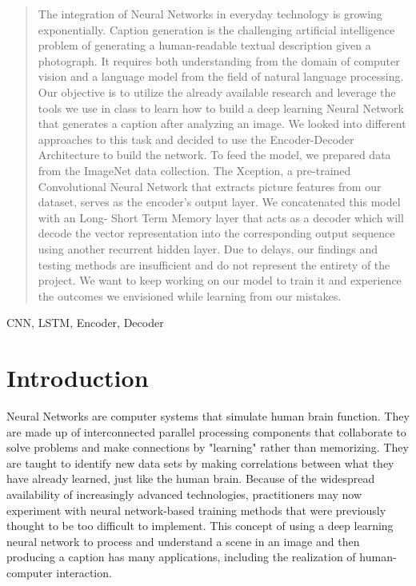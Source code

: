 \documentclass[conference]{IEEEtran}
\begin{document}
\begin{abstract}
The integration of Neural Networks in everyday technology is growing exponentially. Caption generation is the challenging artificial intelligence problem of generating a human-readable textual description given a photograph. It requires both understanding from the domain of computer vision and a language model from the field of natural language processing. Our objective is to utilize the already available research and leverage the tools we use in class to learn how to build a deep learning Neural Network that generates a caption after analyzing an image.  We looked into different approaches to this task and decided to use the Encoder-Decoder Architecture to build the network. To feed the model, we prepared data from the ImageNet data collection. The Xception, a pre-trained Convolutional Neural Network that extracts picture features from our dataset, serves as the encoder's output layer. We concatenated this model with an Long- Short Term Memory layer that acts as a decoder which will decode the vector representation into the corresponding output sequence using another recurrent hidden layer.  Due to delays, our findings and testing methods are insufficient and do not represent the entirety of the project. We want to keep working on our model to train it and experience the outcomes we envisioned while learning from our mistakes.
\end{abstract}



\begin{IEEEkeywords}
CNN, LSTM, Encoder, Decoder
\end{IEEEkeywords}

\section{Introduction}

Neural Networks are computer systems that simulate human brain function. They are made up of interconnected parallel processing components that collaborate to solve problems and make connections by "learning" rather than memorizing. They are taught to identify new data sets by making correlations between what they have already learned, just like the human brain. Because of the widespread availability of increasingly advanced technologies, practitioners may now experiment with neural network-based training methods that were previously thought to be too difficult to implement. This concept of using a deep learning neural network to process and understand a scene in an image and then producing a caption has many applications, including the realization of human-computer interaction. 
\end{document}
